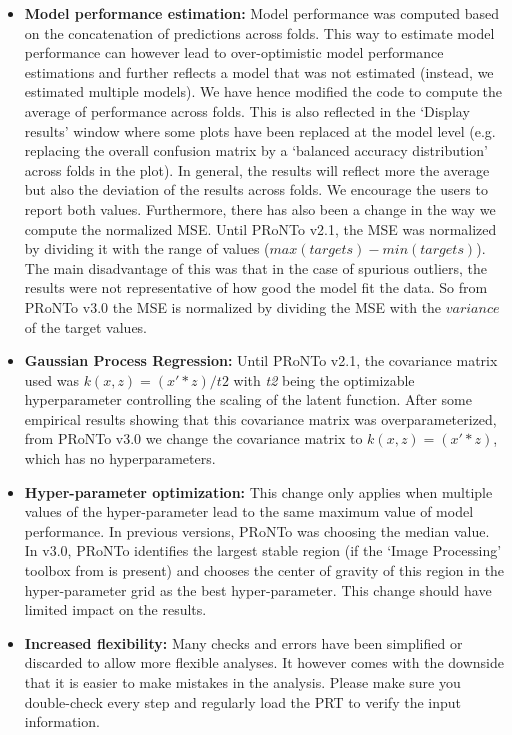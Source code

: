 \begin{itemize}
\item \textbf{Model performance estimation:} Model performance was computed based on the concatenation of predictions across folds. This way to estimate model performance can however lead to over-optimistic model performance estimations and further reflects a model that was not estimated (instead, we estimated multiple models). We have hence modified the code to compute the average of performance across folds. This is also reflected in the `Display results' window where some plots have been replaced at the model level (e.g. replacing the overall confusion matrix by a `balanced accuracy distribution' across folds in the plot). In general, the results will reflect more the average but also the deviation of the results across folds. We encourage the users to report both values.
Furthermore, there has also been a change in the way we compute the normalized MSE. Until PRoNTo v2.1, the MSE was normalized by dividing it with the range of values ($max(targets) - min(targets)$). The main disadvantage of this was that in the case of spurious outliers, the results were not representative of how good the model fit the data. So from PRoNTo v3.0 the MSE is normalized by dividing the MSE with the $variance$ of the target values.

\item \textbf{Gaussian Process Regression:} Until PRoNTo v2.1, the covariance matrix used was $k(x,z) = (x'*z)/t2$ with \textit{t2} being the optimizable hyperparameter controlling the scaling of the latent function. After some empirical results showing that this covariance matrix was overparameterized, from PRoNTo v3.0 we change the covariance matrix to $k(x,z) = (x'*z)$, which has no hyperparameters.


\item \textbf{Hyper-parameter optimization:} This change only applies when multiple values of the hyper-parameter lead to the same maximum value of model performance. In previous versions, PRoNTo was choosing the median value. In v3.0, PRoNTo identifies the largest stable region (if the `Image Processing' toolbox from \matlab{} is present) and chooses the center of gravity of this region in the hyper-parameter grid as the best hyper-parameter. This change should have limited impact on the results.

\item \textbf{Increased flexibility:} Many checks and errors have been simplified or discarded to allow more flexible analyses. It however comes with the downside that it is easier to make mistakes in the analysis. Please make sure you double-check every step and regularly load the PRT to verify the input information.

\end{itemize}

